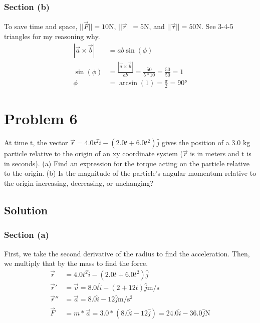 \documentclass[12pt]{article}
\begin{document}
\subsubsection{Section (b)}
To save time and space, \(||\vec{F}|| = 10\unit{\newton}\), \(||\vec{r}|| = 5\unit{\newton}\), and \(||\vec{\tau}|| = 50\unit{\newton}\). See 3-4-5 triangles for my reasoning why.
\begin{align}
    \left|\vec{a}\times\vec{b}\right| &= ab\sin(\phi)\\
    \sin(\phi)  &=  \frac{\left|\vec{a}\times\vec{b}\right|}{ab}
        =   \frac{50}{5*10}
        =   \frac{50}{50}
        =   1\\
    \phi    &= \arcsin(1)
        =   \boxed{\frac{\pi}{2} = 90\unit{\degree}} 
\end{align}

\pagebreak
\section{Problem 6}
At time t, the vector $\vec{r} = 4.0t^2\hat{i} - \left(2.0t + 6.0t^2\right)\hat{j}$ gives the position of a 3.0 kg particle relative to the origin of an xy coordinate system ($\vec{r}$ is in meters and t is in seconds). (a) Find an expression for the torque acting on the particle relative to the origin. (b) Is the magnitude of the particle's angular momentum relative to the origin increasing, decreasing, or unchanging?

\subsection{Solution}
\subsubsection{Section (a)}
First, we take the second derivative of the radius to find the acceleration. Then, we multiply that by the mass to find the force. 
\begin{align}
    \vec{r} &=  4.0t^2\hat{i} - \left(2.0t + 6.0t^2\right)\hat{j}\\
    \vec{r}'    &=  \vec{v}
        =   8.0t\hat{i} - \left(2 + 12t\right)\hat{j} \unit{\meter/\second}\\
    \vec{r}''   &=  \vec{a}
        =   8.0\hat{i} - 12\hat{j} \unit{\meter/\second^2}\\
    \vec{F} &=  m*\vec{a}
        =   3.0*(8.0\hat{i} - 12\hat{j})
        =   24.0\hat{i} - 36.0\hat{j} \unit{\newton}
\end{align}
\end{document}
